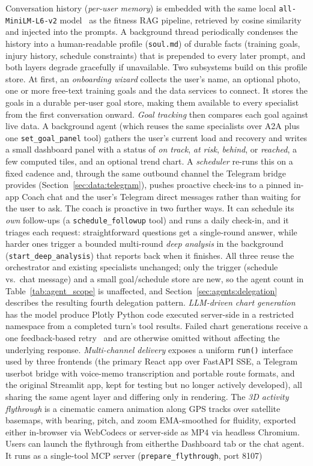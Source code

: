 Conversation history (\textit{per-user memory}) is embedded with the same local \texttt{all-MiniLM-L6-v2} model~\citep{reimers_sentence-bert_2019} as the fitness RAG pipeline, retrieved by cosine similarity and injected into the prompts. A background thread periodically condenses the history into a human-readable profile (\texttt{soul.md}) of durable facts (training goals, injury history, schedule constraints) that is prepended to every later prompt, and both layers degrade gracefully if unavailable. Two subsystems build on this profile store. At first, an \textit{onboarding wizard} collects the user's name, an optional photo, one or more free-text training goals and the data services to connect. It stores the goals in a durable per-user goal store, making them available to every specialist from the first conversation onward. \textit{Goal tracking} then compares each goal against live data. A background agent (which reuses the same specialists over A2A plus one \texttt{set\_goal\_panel} tool) gathers the user's current load and recovery and writes a small dashboard panel with a status of \textit{on track}, \textit{at risk}, \textit{behind}, or \textit{reached}, a few computed tiles, and an optional trend chart. A \textit{scheduler} re-runs this on a fixed cadence and, through the same outbound channel the Telegram bridge provides (Section~\ref{sec:data:telegram}), pushes proactive check-ins to a pinned in-app Coach chat and the user's Telegram direct messages rather than waiting for the user to ask. The coach is proactive in two further ways. It can schedule its \textit{own} follow-ups (a \texttt{schedule\_followup} tool) and runs a daily check-in, and it triages each request: straightforward questions get a single-round answer, while harder ones trigger a bounded multi-round \textit{deep analysis} in the background (\texttt{start\_deep\_analysis}) that reports back when it finishes. All three reuse the orchestrator and existing specialists unchanged; only the trigger (schedule vs.\ chat message) and a small goal/schedule store are new, so the agent count in Table~\ref{tab:agent_scope} is unaffected, and Section~\ref{sec:agents:delegation} describes the resulting fourth delegation pattern. \textit{LLM-driven chart generation} has the model produce Plotly Python code executed server-side in a restricted namespace from a completed turn's tool results. Failed chart generations receive a one feedback-based retry~\citep{shinn_reflexion_2023} and are otherwise omitted without affecting the underlying response. \textit{Multi-channel delivery} exposes a uniform \texttt{run()} interface used by three frontends (the primary React app over FastAPI SSE, a Telegram userbot bridge with voice-memo transcription and portable route formats, and the original Streamlit app, kept for testing but no longer actively developed), all sharing the same agent layer and differing only in rendering. The \textit{3D activity flythrough} is a cinematic camera animation along GPS tracks over satellite basemaps, with bearing, pitch, and zoom EMA-smoothed for fluidity, exported either in-browser via WebCodecs or server-side as MP4 via headless Chromium. Users can launch the flythrough from eitherthe Dashboard tab or the chat agent. It runs as a single-tool MCP server (\texttt{prepare\_flythrough}, port 8107) 